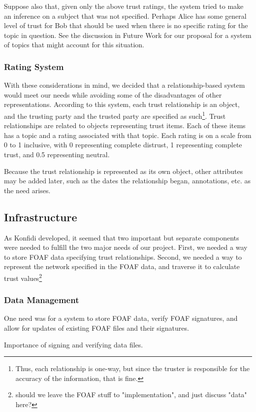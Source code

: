 \documentclass{acm_proc_article-sp}
\begin{document}
Suppose also that, given only the above trust ratings, the system tried to make an inference on a subject that was not specified.  Perhaps Alice has some general level of trust for Bob that should be used when there is no specific rating for the topic in question.  See the discussion in Future Work for our proposal for a system of topics that might account for this situation.

\subsubsection{Rating System}
With these considerations in mind, we decided that a relationship-based system would meet our needs while avoiding some of the disadvantages of other representations.  According to this system, each trust relationship is an object, and the trusting party and the trusted party are specified as such\footnote{Thus, each relationship is one-way, but since the truster is responsible for the accuracy of the information, that is fine.}.  Trust relationships are related to objects representing trust items.  Each of these items has a topic and a rating associated with that topic.  Each rating is on a scale from 0 to 1 inclusive, with 0 representing complete distrust, 1 representing complete trust, and 0.5 representing neutral.

Because the trust relationship is represented as its own object, other attributes may be added later, such as the dates the relationship began, annotations, etc. as the need arises.

\subsection{Infrastructure}
As Konfidi developed, it seemed that two important but separate components were needed to fulfill the two major needs of our project.  First, we needed a way to store FOAF data specifying trust relationships.  Second, we needed a way to represent the network specified in the FOAF data, and traverse it to calculate trust values\footnote{should we leave the FOAF stuff to "implementation", and just discuss "data" here?}
\subsubsection{Data Management}
One need was for a system to store FOAF data, verify FOAF signatures, and allow for updates of existing FOAF files and their signatures.

Importance of signing and verifying data files.
\end{document}
